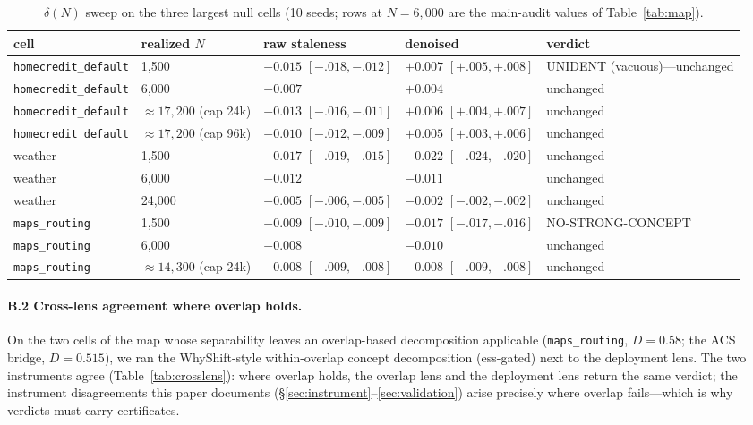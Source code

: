\documentclass[10pt]{article} %
\begin{document}
\begin{table}[h]
\caption{$\delta(N)$ sweep on the three largest null cells (10 seeds; rows at $N = 6{,}000$ are
the main-audit values of Table~\ref{tab:map}).}
\label{tab:deltaN}
\centering
\footnotesize
\setlength{\tabcolsep}{3.5pt}
\begin{tabular}{@{}llll l@{}}
\toprule
cell & realized $N$ & raw staleness & denoised & verdict \\
\midrule
\texttt{homecredit\_default} & 1{,}500 & $-0.015$ $[-.018, -.012]$ & $+0.007$ $[+.005, +.008]$ & UNIDENT (vacuous)---unchanged \\
\texttt{homecredit\_default} & 6{,}000 & $-0.007$ & $+0.004$ & unchanged \\
\texttt{homecredit\_default} & ${\approx}17{,}200$ (cap 24k) & $-0.013$ $[-.016, -.011]$ & $+0.006$ $[+.004, +.007]$ & unchanged \\
\texttt{homecredit\_default} & ${\approx}17{,}200$ (cap 96k) & $-0.010$ $[-.012, -.009]$ & $+0.005$ $[+.003, +.006]$ & unchanged \\
weather & 1{,}500 & $-0.017$ $[-.019, -.015]$ & $-0.022$ $[-.024, -.020]$ & unchanged \\
weather & 6{,}000 & $-0.012$ & $-0.011$ & unchanged \\
weather & 24{,}000 & $-0.005$ $[-.006, -.005]$ & $-0.002$ $[-.002, -.002]$ & unchanged \\
\texttt{maps\_routing} & 1{,}500 & $-0.009$ $[-.010, -.009]$ & $-0.017$ $[-.017, -.016]$ & NO-STRONG-CONCEPT \\
\texttt{maps\_routing} & 6{,}000 & $-0.008$ & $-0.010$ & unchanged \\
\texttt{maps\_routing} & ${\approx}14{,}300$ (cap 24k) & $-0.008$ $[-.009, -.008]$ & $-0.008$ $[-.009, -.008]$ & unchanged \\
\bottomrule
\end{tabular}
\end{table}

\paragraph{B.2 Cross-lens agreement where overlap holds.} On the two cells of the map whose
separability leaves an overlap-based decomposition applicable (\texttt{maps\_routing},
$D = 0.58$; the ACS bridge, $D = 0.515$), we ran the WhyShift-style within-overlap concept
decomposition (ess-gated) next to the deployment lens. The two instruments agree
(Table~\ref{tab:crosslens}): where overlap holds, the overlap lens and the deployment lens
return the same verdict; the instrument disagreements this paper documents
(\S\ref{sec:instrument}--\ref{sec:validation}) arise precisely where overlap fails---which is
why verdicts must carry certificates.
\end{document}
